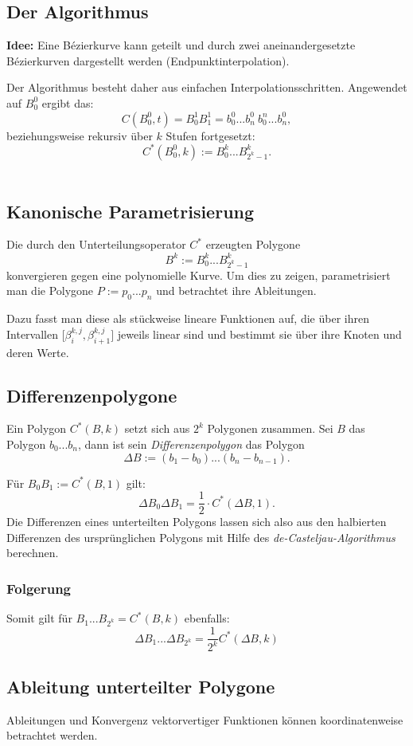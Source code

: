 \subsection{Der Algorithmus}
\textbf{Idee:} Eine Bézierkurve kann geteilt und durch zwei aneinandergesetzte Bézierkurven dargestellt werden (Endpunktinterpolation).

Der Algorithmus besteht daher aus einfachen Interpolationsschritten. Angewendet auf \(B_0^0\) ergibt das:
\[C(B_0^0,t) = B_0^1B_1^1 = b_0^0...b_n^0~b_0^n...b_n^0,\]
beziehungsweise rekursiv über \(k\) Stufen fortgesetzt:
\[C^*(B_0^0,k):=B_0^k...B_{2^k-1}^k.\]
\text{}\\



\subsection{Kanonische Parametrisierung}
Die durch den Unterteilungsoperator \(C^*\) erzeugten Polygone
\[B^k := B_0^k...B_{2^k-1}^k\]
konvergieren gegen eine polynomielle Kurve. Um dies zu zeigen, parametrisiert man die Polygone \(P:=p_0...p_n\) und betrachtet ihre Ableitungen.

Dazu fasst man diese als stückweise lineare Funktionen auf, die über ihren Intervallen \(\lbrack \beta_i^{k,j},\beta_{i+1}^{k,j}\rbrack\) jeweils linear sind und bestimmt sie über ihre Knoten und deren Werte.


\subsection{Differenzenpolygone}
Ein Polygon \(C^*(B,k)\) setzt sich aus \(2^k\) Polygonen zusammen. Sei \(B\) das Polygon \(b_0...b_n\), dann ist sein \textit{Differenzenpolygon} das Polygon
\[\Delta B := (b_1-b_0)...(b_n-b_{n-1}).\]

Für \(B_0B_1 := C^*(B,1)\) gilt:
\[\Delta B_0\Delta B_1 = \frac{1}{2}\cdot C^*(\Delta B,1).\]
Die Differenzen eines unterteilten Polygons lassen sich also aus den halbierten Differenzen des ursprünglichen Polygons mit Hilfe des \textit{de-Casteljau-Algorithmus} berechnen.

\subsubsection{Folgerung}
Somit gilt für \(B_1...B_{2^k} = C^*(B,k)\) ebenfalls:
\[\Delta B_1...\Delta B_{2^k} = \frac{1}{2^k}C^*(\Delta B,k)\]


\subsection{Ableitung unterteilter Polygone}
Ableitungen und Konvergenz vektorvertiger Funktionen können koordinatenweise betrachtet werden.

